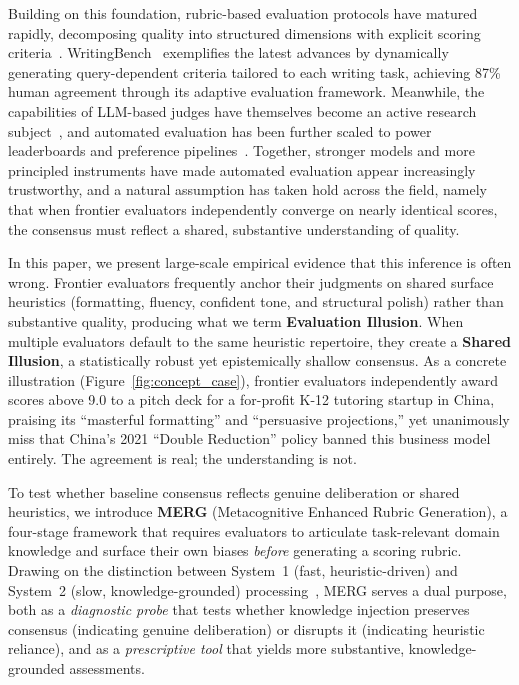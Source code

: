 \documentclass{article}
\begin{document}
Building on this foundation, rubric-based evaluation protocols have matured rapidly, decomposing quality into structured dimensions with explicit scoring criteria~\citep{ye2024flask, kim2024prometheus, kim2024prometheus2, rao2026autorubric}. WritingBench~\citep{wu2025writingbench} exemplifies the latest advances by dynamically generating query-dependent criteria tailored to each writing task, achieving 87\% human agreement through its adaptive evaluation framework. Meanwhile, the capabilities of LLM-based judges have themselves become an active research subject~\citep{li2024generation, tan2025judgebench}, and automated evaluation has been further scaled to power leaderboards and preference pipelines~\citep{li2024arenahard}. Together, stronger models and more principled instruments have made automated evaluation appear increasingly trustworthy, and a natural assumption has taken hold across the field, namely that when frontier evaluators independently converge on nearly identical scores, the consensus must reflect a shared, substantive understanding of quality.

In this paper, we present large-scale empirical evidence that this inference is often wrong. Frontier evaluators frequently anchor their judgments on shared surface heuristics (formatting, fluency, confident tone, and structural polish) rather than substantive quality, producing what we term \textbf{Evaluation Illusion}. When multiple evaluators default to the same heuristic repertoire, they create a \textbf{Shared Illusion}, a statistically robust yet epistemically shallow consensus. As a concrete illustration (Figure~\ref{fig:concept_case}), frontier evaluators independently award scores above 9.0 to a pitch deck for a for-profit K-12 tutoring startup in China, praising its ``masterful formatting'' and ``persuasive projections,'' yet unanimously miss that China's 2021 ``Double Reduction'' policy banned this business model entirely. The agreement is real; the understanding is not.

To test whether baseline consensus reflects genuine deliberation or shared heuristics, we introduce \textbf{MERG} (Metacognitive Enhanced Rubric Generation), a four-stage framework that requires evaluators to articulate task-relevant domain knowledge and surface their own biases \textit{before} generating a scoring rubric. Drawing on the distinction between System~1 (fast, heuristic-driven) and System~2 (slow, knowledge-grounded) processing~\citep{kahneman2011thinking}, MERG serves a dual purpose, both as a \textit{diagnostic probe} that tests whether knowledge injection preserves consensus (indicating genuine deliberation) or disrupts it (indicating heuristic reliance), and as a \textit{prescriptive tool} that yields more substantive, knowledge-grounded assessments.
\end{document}
